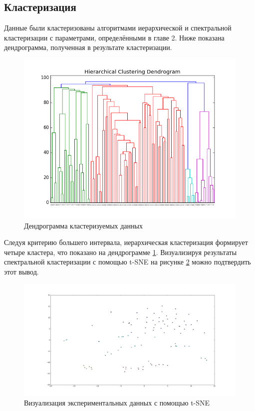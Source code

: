\subsection{Кластеризация}
Данные были кластеризованы алгоритмами иерархической и спектральной кластеризации с параметрами, определёнными в главе 2. Ниже показана дендрограмма, полученная в результате кластеризации.
\begin{figure}[H]
	\center
  \includegraphics[width=0.75\linewidth]{pics/original_normalized.png}
  \caption{Дендрограмма кластеризуемых данных}
  \label{dendrogram_experimental}
\end{figure}

Следуя критерию большего интервала, иерархическая кластеризация формирует четыре кластера, что показано на дендрограмме \ref{dendrogram_experimental}. Визуализируя результаты спектральной кластеризации с помощью t-SNE на рисунке \ref{tsne_experimental} можно подтвердить этот вывод.
\begin{figure}[H]
	\center
  \includegraphics[width=\linewidth]{pics/tsne_color_experimental.png}
  \caption{Визуализация экспериментальных данных с помощью t-SNE}
  \label{tsne_experimental}
\end{figure}

